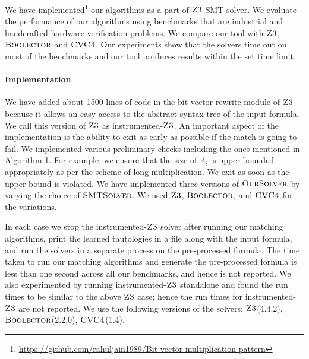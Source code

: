 %
We have implemented\footnote{\url{https://github.com/rahuljain1989/Bit-vector-multiplication-pattern}} our algorithms as a part of $\textsc{Z3}$ SMT solver.
%
 We evaluate the performance of our algorithms using benchmarks that are industrial and handcrafted hardware verification problems.
%
We compare our tool with $\textsc{Z3}$, $\textsc{Boolector}$ and $\textsc{CVC4}$.
%
Our experiments show that the solvers time out on most of the benchmarks and our tool produces results within the set time limit.

\paragraph{\bf Implementation}
We have added about 1500 lines of code in the bit vector rewrite module of $\textsc{Z3}$ because it allows an easy access to the abstract syntax tree of the input formula. We call this version of $\textsc{Z3}$ as instrumented-$\textsc{Z3}$.
%
An important aspect of the implementation is the ability to exit as early as possible if the match is going to fail.
%
We implemented various preliminary checks including the ones mentioned in Algorithm 1. For example, we ensure that the size of $\Lambda_i$ is upper bounded appropriately as per the scheme of long multiplication. We exit as soon as the upper bound is violated. 
%
We have implemented three versions of $\textsc{OurSolver}$ by varying the choice of $\textsc{SMTSolver}$.
%
We used  $\textsc{Z3}$, $\textsc{Boolector}$, and $\textsc{CVC4}$ for the variations. 
%

In each case we stop the instrumented-$\textsc{Z3}$ solver after running our matching algorithms,
print the learned tautologies in a file along with the input formula, and
run the solvers in a separate process on the pre-processed formula. 
The time taken to run our matching algorithms and generate the pre-processed formula is less than one second across all our benchmarks, and hence is not reported. 
We also experimented by running instrumented-$\textsc{Z3}$ standalone and found the run times to be similar to the above $\textsc{Z3}$ case; hence the run times for instrumented-$\textsc{Z3}$ are not reported. We use the following versions of the solvers: $\textsc{Z3}$(4.4.2), $\textsc{Boolector}$(2.2.0), $\textsc{CVC4}$(1.4).


